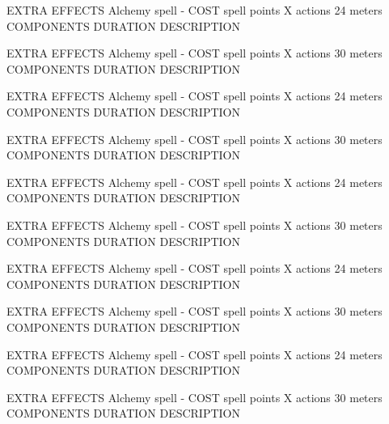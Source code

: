         EXTRA EFFECTS
        {Alchemy spell - COST spell points}
        {X actions}
        {24 meters}
        {COMPONENTS}
        {DURATION}
        DESCRIPTION

        EXTRA EFFECTS
        {Alchemy spell - COST spell points}
        {X actions}
        {30 meters}
        {COMPONENTS}
        {DURATION}
        DESCRIPTION

        EXTRA EFFECTS
        {Alchemy spell - COST spell points}
        {X actions}
        {24 meters}
        {COMPONENTS}
        {DURATION}
        DESCRIPTION

        EXTRA EFFECTS
        {Alchemy spell - COST spell points}
        {X actions}
        {30 meters}
        {COMPONENTS}
        {DURATION}
        DESCRIPTION

        EXTRA EFFECTS
        {Alchemy spell - COST spell points}
        {X actions}
        {24 meters}
        {COMPONENTS}
        {DURATION}
        DESCRIPTION

        EXTRA EFFECTS
        {Alchemy spell - COST spell points}
        {X actions}
        {30 meters}
        {COMPONENTS}
        {DURATION}
        DESCRIPTION

        EXTRA EFFECTS
        {Alchemy spell - COST spell points}
        {X actions}
        {24 meters}
        {COMPONENTS}
        {DURATION}
        DESCRIPTION

        EXTRA EFFECTS
        {Alchemy spell - COST spell points}
        {X actions}
        {30 meters}
        {COMPONENTS}
        {DURATION}
        DESCRIPTION

        EXTRA EFFECTS
        {Alchemy spell - COST spell points}
        {X actions}
        {24 meters}
        {COMPONENTS}
        {DURATION}
        DESCRIPTION

        EXTRA EFFECTS
        {Alchemy spell - COST spell points}
        {X actions}
        {30 meters}
        {COMPONENTS}
        {DURATION}
        DESCRIPTION

